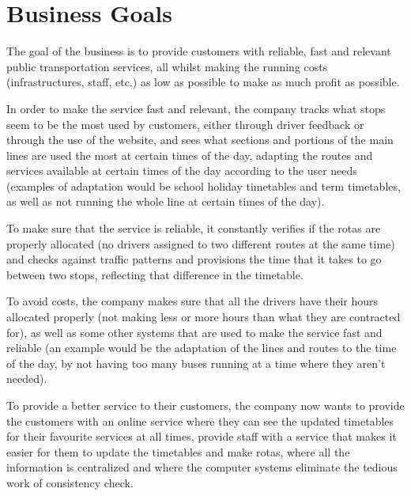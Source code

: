 \section{Business Goals}

The goal of the business is to provide customers with reliable, fast and relevant public transportation services,
all whilst making the running costs (infrastructures, staff, etc.) as low as possible to make as much profit as possible.

\medskip

In order to make the service fast and relevant, the company tracks what stops seem to be the most used by customers,
either through driver feedback or through the use of the website, and sees what sections and portions of the main lines
are used the most at certain times of the day, adapting the routes and services available at certain times of the day according
to the user needs (examples of adaptation would be school holiday timetables and term timetables, as well as not running the
whole line at certain times of the day).

\medskip

To make sure that the service is reliable, it constantly verifies if the rotas are properly allocated (no drivers assigned to two different
routes at the same time) and checks against traffic patterns and provisions the time that it takes to go between two stops, reflecting
that difference in the timetable.

\medskip

To avoid costs, the company makes sure that all the drivers have their hours allocated properly (not making less or more hours than
what they are contracted for), as well as some other systems that are used to make the service fast and reliable (an example would be
the adaptation of the lines and routes to the time of the day, by not having too many buses running at a time where they aren't needed).

\medskip

To provide a better service to their customers, the company now wants to provide the customers with an online service where they can see
the updated timetables for their favourite services at all times, provide staff with a service that makes it easier for them to update the timetables
and make rotas, where all the information is centralized and where the computer systems eliminate the tedious work of consistency check.
